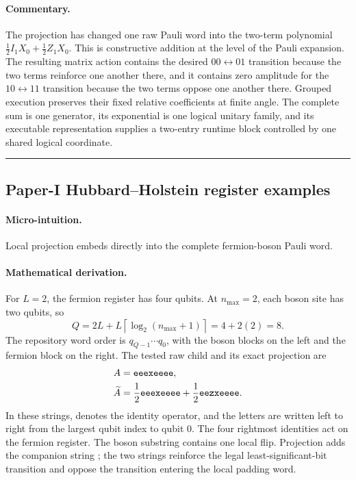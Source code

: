 \documentclass[10pt,twocolumn]{article}
\newcommand{\conceptbreak}{%
  \par\medskip\noindent
  {\color{black!30}\rule{\columnwidth}{0.35pt}}%
  \par\medskip}
\newcommand{\micro}{\paragraph{Micro-intuition.}}
\newcommand{\mathderiv}{\paragraph{Mathematical derivation.}}
\newcommand{\commentaryblock}{\paragraph{Commentary.}}
\newcommand{\codeword}[1]{\texttt{\detokenize{#1}}}
\begin{document}
\commentaryblock The projection has changed one raw Pauli word into the
two-term polynomial
\(\tfrac12I_1X_0+\tfrac12Z_1X_0\). This is constructive addition at the level
of the Pauli expansion. The resulting matrix action contains the desired
\(00\leftrightarrow01\) transition because the two terms reinforce one
another there, and it contains zero amplitude for the
\(10\leftrightarrow11\) transition because the two terms oppose one another
there. Grouped execution preserves their fixed relative coefficients at finite
angle. The complete sum is one generator, its exponential is one logical
unitary family, and its executable representation supplies a two-entry runtime
block controlled by one shared logical coordinate.

\conceptbreak

\subsection*{Paper-I Hubbard--Holstein register examples}

\micro Local projection embeds directly into the complete fermion-boson Pauli
word.

\mathderiv For \(L=2\), the fermion register has four qubits. At
\(n_{\max}=2\), each boson site has two qubits, so
\begin{equation}
Q=2L+L\left\lceil\log_2(n_{\max}+1)\right\rceil
=4+2(2)=8.
\label{eq:hh-eight-qubits}
\end{equation}
The repository word order is \(q_{Q-1}\cdots q_0\), with the boson blocks on
the left and the fermion block on the right. The tested raw child and its exact
projection are
\begin{align}
 A&=\codeword{eeexeeee},\nonumber\\
\widetilde A
&=\frac12\codeword{eeexeeee}
+\frac12\codeword{eezxeeee}.
\label{eq:hh-nph2-projection}
\end{align}
In these strings, \codeword{e} denotes the identity operator, and the letters
are written left to right from the largest qubit index to qubit \(0\). The four
rightmost identities act on the fermion register. The boson substring
\codeword{eeex} contains one local \codeword{ex} flip. Projection adds the
companion string \codeword{eezx}; the two strings reinforce the legal
least-significant-bit transition and oppose the transition entering the local
padding word.
\end{document}
